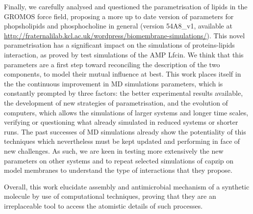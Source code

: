 Finally, we carefully analysed and questioned the parametrisation of lipids in the GROMOS force field, proposing a more up to date version of parameters for phopsholipids and phosphocholine in general (version 54A8\_v1, available at \url{http://fraternalilab.kcl.ac.uk/wordpress/biomembrane-simulations/}). This novel parametrisation has a significant impact on the simulations of proteins-lipids interaction, as proved by test simulations of the AMP Lfcin. We think that this parameters are a first step toward reconciling the description of the two components, to model their mutual influence at best.
%
This work places itself in the the continuous improvement in MD simulations parameters, which is constantly prompted by three factors: the better experimental results available, the development of new strategies of parametrisation, and the evolution of computers, which allows the simulations of larger systems and longer time scales, verifying or questioning what already simulated in reduced systems or shorter runs.
%
The past successes of MD simulations already show the potentiality of this techniques which nevertheless must be kept updated and performing in face of new challenges.
As such, we are keen in testing more extensively the new parameters on other systems and to repeat selected simulations of capzip on model membranes to understand the type of interactions that they propose.

Overall, this work elucidate assembly and antimicrobial mechanism of a synthetic molecule by use of computational techniques, proving that they are an irreplaceable tool to access the atomistic details of such processes.

